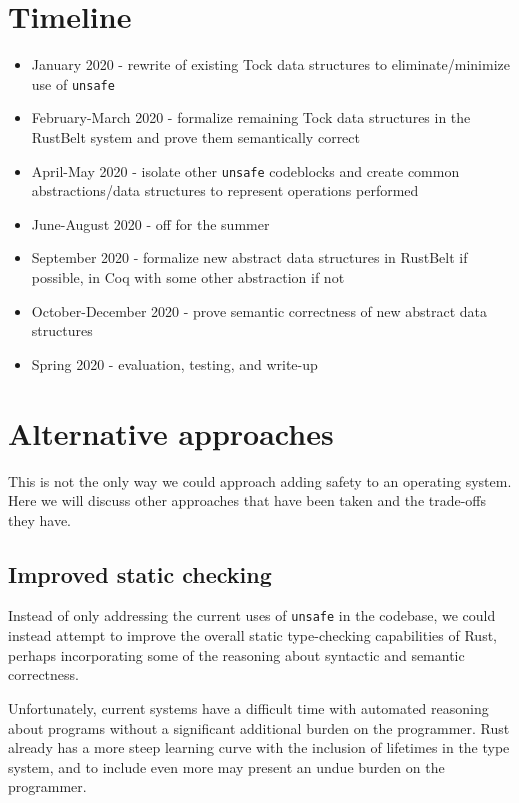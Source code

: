 \documentclass[12pt]{article}
\begin{document}

\section{Timeline}
\begin{itemize}
    \item January 2020 - rewrite of existing Tock data structures to eliminate/minimize use of \texttt{unsafe}
    \item February-March 2020 - formalize remaining Tock data structures in the RustBelt system and prove them semantically correct
    \item April-May 2020 - isolate other \texttt{unsafe} codeblocks and create common abstractions/data structures to represent operations performed
    \item June-August 2020 - off for the summer
    \item September 2020 - formalize new abstract data structures in RustBelt if possible, in Coq with some other abstraction if not
    \item October-December 2020 - prove semantic correctness of new abstract data structures
    \item Spring 2020 - evaluation, testing, and write-up
\end{itemize}

\section{Alternative approaches}
This is not the only way we could approach adding safety to an operating system. Here we will discuss other approaches that have been taken and the trade-offs they have.

\subsection{Improved static checking}
Instead of only addressing the current uses of \texttt{unsafe} in the codebase, we could instead attempt to improve the overall static type-checking capabilities of Rust, perhaps incorporating some of the reasoning about syntactic and semantic correctness.

Unfortunately, current systems have a difficult time with automated reasoning about programs without a significant additional burden on the programmer. Rust already has a more steep learning curve with the inclusion of lifetimes in the type system, and to include even more may present an undue burden on the programmer.
\end{document}
